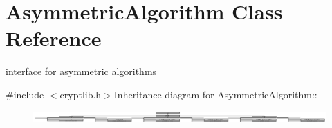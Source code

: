 \hypertarget{class_asymmetric_algorithm}{
\section{AsymmetricAlgorithm Class Reference}
\label{class_asymmetric_algorithm}
}


interface for asymmetric algorithms  


{\ttfamily \#include $<$cryptlib.h$>$}Inheritance diagram for AsymmetricAlgorithm::\begin{figure}[H]
\begin{center}
\leavevmode
\includegraphics[height=0.479247cm]{class_asymmetric_algorithm}
\end{center}
\end{figure}
